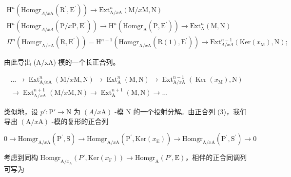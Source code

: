 \[
\begin{array}{c} \mathrm{H} ^ {n} (\mathrm{Homgr} _ {A / x \mathrm{A}} (\mathrm{R} ^ {\prime}, \mathrm{E} ^ {\prime})) \longrightarrow \mathrm{Ext} _ {\mathrm{A} / x \mathrm{A}} ^ {n} (\mathrm{M} / x \mathrm{M}, \mathrm{N}) \\ \mathrm{H} ^ {n} (\mathrm{Homgr} _ {A / x A} (\mathrm{P} / x \mathrm{P}, \mathrm{E} ^ {\prime})) \longrightarrow \mathrm{H} ^ {n} (\mathrm{Homgr} _ {\mathrm{A}} (\mathrm{P}, \mathrm{E} ^ {\prime})) \longrightarrow \mathrm{Ext} _ {\mathrm{A}} ^ {n} (\mathrm{M}, \mathrm{N}) \\ \Pi^ {n} (\mathrm{Homgr} _ {\mathrm{A} / x \mathrm{A}} (\mathrm{R}, \mathrm{E} ^ {\prime})) = \mathrm{H} ^ {n - 1} (\mathrm{Homgr} _ {\mathrm{A} / x \mathrm{A}} (\mathrm{R} (1), \mathrm{E} ^ {\prime})) \longrightarrow \mathrm{Ext} _ {A / x A} ^ {n - 1} (\mathrm{Ker} (x _ {\mathrm{M}}), \mathrm{N}); \end{array}
\]

由此导出 (A/xA)-模的一个长正合列。

\[
\begin{array}{c} \dots \longrightarrow \operatorname{Ext} _ {\mathrm{A} / x \mathrm{A}} ^ {n} (\mathrm{M} / x \mathrm{M}, \mathrm{N}) \longrightarrow \operatorname{Ext} _ {\mathrm{A}} ^ {n} (\mathrm{M}, \mathrm{N}) \longrightarrow \operatorname{Ext} _ {\mathrm{A} / x \mathrm{A}} ^ {n - 1} (\operatorname{Ker} (x _ {\mathrm{M}}), \mathrm{N}) \\ \longrightarrow \operatorname{Ext} _ {\mathrm{A} / x \mathrm{A}} ^ {n + 1} (\mathrm{M} / x \mathrm{M}, \mathrm{N}) \longrightarrow \operatorname{Ext} _ {\mathrm{A}} ^ {n + 1} (\mathrm{M}, \mathrm{N}) \longrightarrow \dots \end{array}\tag{4}
\]

类似地，设 \(p' : \mathrm{P}' \to \mathrm{N}\) 为 \((A / x\mathrm{A})\) -模 \(\mathrm{N}\) 的一个投射分解。由正合列 (3)，我们导出 \((\mathrm{A} / x\mathrm{A})\) -模的复形的正合列

\[
0 \to \mathrm{Homgr} _ {\mathrm{A} / x \mathrm{A}} (\mathrm{P} ^ {\prime}, \mathrm{S}) \longrightarrow \mathrm{Homgr} _ {\mathrm{A} / x \mathrm{A}} (\mathrm{P} ^ {\prime}, \mathrm{Ker} (x _ {\mathrm{E}})) \longrightarrow \mathrm{Homgr} _ {\mathrm{A} / x \mathrm{A}} (\mathrm{P} ^ {\prime}, \mathrm{S} ^ {\prime}) \rightarrow 0
\]

考虑到同构 \(\mathrm{Homgr}_{\mathrm{A}/x_{\mathrm{A}}}(P',\mathrm{Ker}(x_{\mathrm{F}})) \longrightarrow \mathrm{Homgr}_{\mathrm{A}}(P',\mathrm{E})\)，相伴的正合同调列可写为

